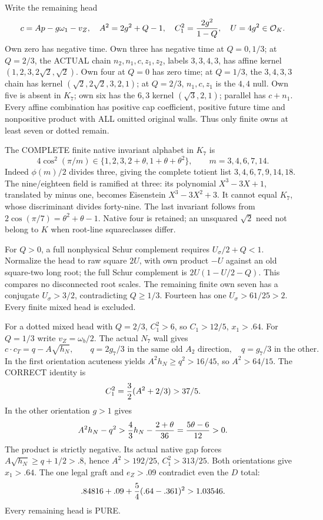 \documentclass[11pt]{article}
\begin{document}
Write the remaining head
\[
 c=Ap-g\omega_1-v_Z,\quad
 A^2=2g^2+Q-1,\quad
 C_1^2={2g^2\over1-Q},\quad U=4g^2\in\mathcal O_K.
\]
Own zero has negative time.
Own three has negative time at \(Q=0,1/3\);
at \(Q=2/3\), the ACTUAL chain
\(n_2,n_1,c,z_1,z_2\), labels \(3,3,4,3\),
has affine kernel \((1,2,3,2\sqrt2,\sqrt2)\).
Own four at \(Q=0\) has zero time;
at \(Q=1/3\), the \(3,4,3,3\) chain has kernel
\((\sqrt2,2\sqrt2,3,2,1)\);
at \(Q=2/3\), \(n_1,c,z_1\) is the \(4,4\) null.
Own five is absent in \(K_7\); own six has the
\(6,3\) kernel \((\sqrt3,2,1)\);
parallel has \(c+n_1\).
Every affine combination has positive cap coefficient,
positive future time and nonpositive product with
ALL omitted original walls.
Thus only finite owns at least seven or dotted remain.

The COMPLETE finite native invariant alphabet in \(K_7\) is
\[
           4\cos^2(\pi/m)\in
             \{1,2,3,2+\theta,1+\theta+\theta^2\},
 \qquad m=3,4,6,7,14 .
\tag{TA}\label{eq:arithK7native}
\]
Indeed \(\phi(m)/2\) divides three, giving the
complete totient list \(3,4,6,7,9,14,18\).
The nine/eighteen field is ramified at three:
its polynomial \(X^3-3X+1\), translated by minus one,
becomes Eisenstein \(X^3-3X^2+3\).
It cannot equal \(K_7\), whose discriminant divides
forty-nine.
The last invariant follows from
\(2\cos(\pi/7)=\theta^2+\theta-1\).
Native four is retained; an unsquared \(\sqrt2\)
need not belong to \(K\) when root-line squareclasses differ.

For \(Q>0\), a full nonphysical Schur complement
requires \(U_\sigma/2+Q<1\).
Normalize the head to raw square \(2U\), with own
product \(-U\) against an old square-two long root;
the full Schur complement is \(2U(1-U/2-Q)\).
This compares no disconnected root scales.
The remaining finite own seven has a conjugate
\(U_\sigma>3/2\), contradicting \(Q\ge1/3\).
Fourteen has one \(U_\sigma>61/25>2\).
Every finite mixed head is excluded.

For a dotted mixed head with \(Q=2/3\),
\(C_1^2>6\), so \(C_1>12/5\), \(x_1>.64\).
For \(Q=1/3\) write \(v_Z=\omega_b/2\).
The actual \(N_7\) wall gives
\[
 c\cdot c_T=q-A\sqrt{h_N},\qquad
 q=2g_7/3\text{ in the same old }A_2\text{ direction},
 \quad q=g_7/3\text{ in the other}.
\]
In the first orientation acuteness yields
\(A^2h_N\ge q^2>16/45\), so \(A^2>64/15\).
The CORRECT identity is
\[
                         C_1^2={3\over2}(A^2+2/3)>37/5 .
\]
In the other orientation \(g>1\) gives
\[
 A^2h_N-q^2>{4\over3}h_N-{2+\theta\over36}
                  ={5\theta-6\over12}>0 .
\]
The product is strictly negative.
Its actual native gap forces
\(A\sqrt{h_N}\ge q+1/2>.8\), hence
\(A^2>192/25\), \(C_1^2>313/25\).
Both orientations give \(x_1>.64\).
The one legal graft and \(e_Z>.09\) contradict
even the \(D\) total:
\[
                  .84816+.09+{5\over4}(.64-.361)^2>1.03546 .
\]
Every remaining head is PURE.
\end{document}
